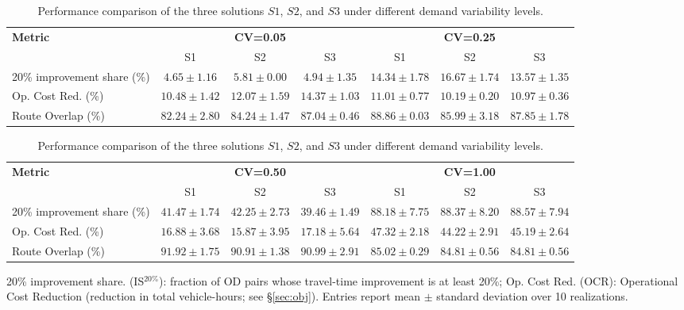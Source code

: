 \documentclass[a4paper,fleqn]{cas-sc}
\begin{document}
\begin{table}[t]
\centering
\scriptsize
\setlength{\tabcolsep}{2.5pt}
\begin{threeparttable}

\begin{tabular}{lcccccc}
\toprule
\textbf{Metric} 
  & \multicolumn{3}{c}{\textbf{CV=0.05}} 
  & \multicolumn{3}{c}{\textbf{CV=0.25}} \\
\cmidrule(lr){2-4} \cmidrule(lr){5-7}
& S1 & S2 & S3 & S1 & S2 & S3 \\
\midrule
20\% improvement share (\%) 
  & $4.65\pm1.16$ & $5.81\pm0.00$ & $4.94\pm1.35$ 
  & $14.34\pm1.78$ & $16.67\pm1.74$ & $13.57\pm1.35$ \\
Op. Cost Red. (\%) 
  & $10.48\pm1.42$ & $12.07\pm1.59$ & $14.37\pm1.03$ 
  & $11.01\pm0.77$ & $10.19\pm0.20$ & $10.97\pm0.36$ \\
Route Overlap (\%) 
  & $82.24\pm2.80$ & $84.24\pm1.47$ & $87.04\pm0.46$ 
  & $88.86\pm0.03$ & $85.99\pm3.18$ & $87.85\pm1.78$ \\
\bottomrule
\end{tabular}

\vspace{0.5em}

\begin{tabular}{lcccccc}
\toprule
\textbf{Metric} 
  & \multicolumn{3}{c}{\textbf{CV=0.50}} 
  & \multicolumn{3}{c}{\textbf{CV=1.00}} \\
\cmidrule(lr){2-4} \cmidrule(lr){5-7}
& S1 & S2 & S3 & S1 & S2 & S3 \\
\midrule
20\% improvement share (\%) 
  & $41.47\pm1.74$ & $42.25\pm2.73$ & $39.46\pm1.49$ 
  & $88.18\pm7.75$ & $88.37\pm8.20$ & $88.57\pm7.94$ \\
Op. Cost Red. (\%) 
  & $16.88\pm3.68$ & $15.87\pm3.95$ & $17.18\pm5.64$
  & $47.32\pm2.18$ & $44.22\pm2.91$ & $45.19\pm2.64$ \\
Route Overlap (\%) 
  & $91.92\pm1.75$ & $90.91\pm1.38$ & $90.99\pm2.91$ 
  & $85.02\pm0.29$ & $84.81\pm0.56$ & $84.81\pm0.56$ \\
\bottomrule
\end{tabular}

\begin{tablenotes}
\item 20\% improvement share. (IS$^{20\%}$): fraction of OD pairs whose travel-time improvement is at least 20\%;
Op. Cost Red. (OCR): Operational Cost Reduction (reduction in total vehicle-hours; see \S\ref{sec:obj}).
Entries report mean $\pm$ standard deviation over 10 realizations.
\end{tablenotes}

\end{threeparttable}
\caption{Performance comparison of the three solutions $S1$, $S2$, and $S3$ under different demand variability levels.}
\label{tab:perfS123}
\end{table}
\end{document}
